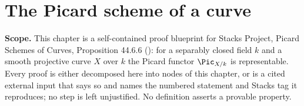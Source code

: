 %

\chapter{The Picard scheme of a curve}\label{chap:picard-scheme-of-a-curve}

\noindent\textbf{Scope.}
This chapter is a self-contained proof blueprint for Stacks Project, Picard Schemes of Curves,
Proposition 44.6.6 (): for a separably closed field $k$ and a smooth projective curve
$X$ over $k$ the Picard functor $\Pic_{X/k}$ is representable.  Every proof is either decomposed here
into nodes of this chapter, or is a cited external input that says so and names the numbered statement
and Stacks tag it reproduces; no step is left unjustified.  No definition asserts a provable property.

